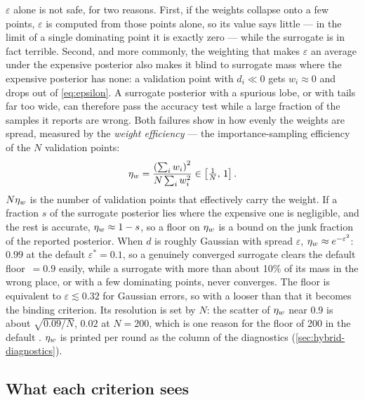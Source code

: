$\varepsilon$ alone is not safe, for two reasons. First, if the weights collapse onto a few points,
$\varepsilon$ is computed from those points alone, so its value says little --- in the limit of a
single dominating point it is exactly zero --- while the surrogate is in fact terrible. Second, and more commonly, the
weighting that makes $\varepsilon$ an average under the expensive posterior also makes it blind to
surrogate mass where the expensive posterior has none: a validation point with $d_i \ll 0$ gets
$w_i \approx 0$ and drops out of \cref{eq:epsilon}. A surrogate posterior with a spurious lobe, or
with tails far too wide, can therefore pass the accuracy test while a large fraction of the samples
it reports are wrong. Both failures show in how evenly the weights are spread, measured by the
\emph{weight efficiency} --- the importance-sampling efficiency of the $N$ validation points:
\begin{equation}
  \eta_w = \frac{\left(\sum_i w_i\right)^2}{N\sum_i w_i^2} \in \left[\tfrac{1}{N},\, 1\right].
  \label{eq:weight-efficiency}
\end{equation}
$N\eta_w$ is the number of validation points that effectively carry the weight. If a fraction $s$ of
the surrogate posterior lies where the expensive one is negligible, and the rest is accurate,
$\eta_w \approx 1 - s$, so a floor on $\eta_w$ is a bound on the junk fraction of the reported
posterior. When $d$ is roughly Gaussian with spread $\varepsilon$, $\eta_w \approx e^{-\varepsilon^2}$:
$0.99$ at the default $\varepsilon^\ast = 0.1$, so a genuinely converged surrogate clears the default
floor $\,= 0.9$ easily, while a surrogate with more than about 10\% of its
mass in the wrong place, or with a few dominating points, never converges. The floor is equivalent
to $\varepsilon \lesssim 0.32$ for Gaussian errors, so with a looser  than
that it becomes the binding criterion. Its resolution is set by $N$: the scatter of $\eta_w$ near
$0.9$ is about $\sqrt{0.09/N}$, $0.02$ at $N = 200$, which is one reason for the floor of 200 in the
default . $\eta_w$ is printed per round as the  column of the
diagnostics (\cref{sec:hybrid-diagnostics}).

\subsection{What each criterion sees}
\label{sec:criteria-cases}

